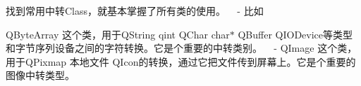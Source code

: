
\begin{DoxyItemize}
\item 找到常用中转\+Class，就基本掌握了所有类的使用。 ~\newline
 -\/ 比如
\begin{DoxyItemize}
\item Q\+Byte\+Array 这个类，用于\+Q\+String qint Q\+Char char$\ast$ Q\+Buffer Q\+I\+O\+Device等类型和字节序列设备之间的字符转换。它是个重要的中转类别。 ~\newline
 -\/ Q\+Image 这个类，用于\+Q\+Pixmap 本地文件 Q\+Icon的转换，通过它把文件传到屏幕上。它是个重要的图像中转类型。 
\end{DoxyItemize}
\end{DoxyItemize}